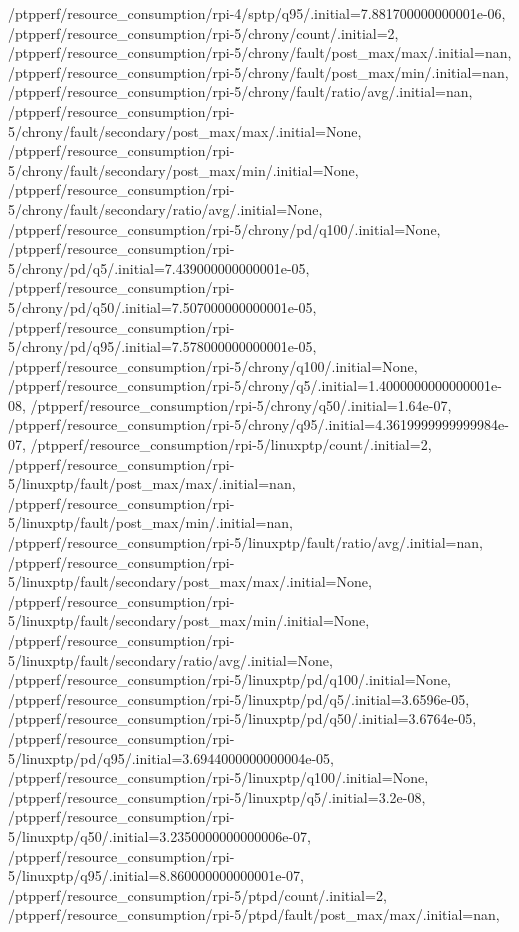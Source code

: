 {    /ptpperf/resource_consumption/rpi-4/sptp/q95/.initial=7.881700000000001e-06,
    /ptpperf/resource_consumption/rpi-5/chrony/count/.initial=2,
    /ptpperf/resource_consumption/rpi-5/chrony/fault/post_max/max/.initial=nan,
    /ptpperf/resource_consumption/rpi-5/chrony/fault/post_max/min/.initial=nan,
    /ptpperf/resource_consumption/rpi-5/chrony/fault/ratio/avg/.initial=nan,
    /ptpperf/resource_consumption/rpi-5/chrony/fault/secondary/post_max/max/.initial=None,
    /ptpperf/resource_consumption/rpi-5/chrony/fault/secondary/post_max/min/.initial=None,
    /ptpperf/resource_consumption/rpi-5/chrony/fault/secondary/ratio/avg/.initial=None,
    /ptpperf/resource_consumption/rpi-5/chrony/pd/q100/.initial=None,
    /ptpperf/resource_consumption/rpi-5/chrony/pd/q5/.initial=7.439000000000001e-05,
    /ptpperf/resource_consumption/rpi-5/chrony/pd/q50/.initial=7.507000000000001e-05,
    /ptpperf/resource_consumption/rpi-5/chrony/pd/q95/.initial=7.578000000000001e-05,
    /ptpperf/resource_consumption/rpi-5/chrony/q100/.initial=None,
    /ptpperf/resource_consumption/rpi-5/chrony/q5/.initial=1.4000000000000001e-08,
    /ptpperf/resource_consumption/rpi-5/chrony/q50/.initial=1.64e-07,
    /ptpperf/resource_consumption/rpi-5/chrony/q95/.initial=4.3619999999999984e-07,
    /ptpperf/resource_consumption/rpi-5/linuxptp/count/.initial=2,
    /ptpperf/resource_consumption/rpi-5/linuxptp/fault/post_max/max/.initial=nan,
    /ptpperf/resource_consumption/rpi-5/linuxptp/fault/post_max/min/.initial=nan,
    /ptpperf/resource_consumption/rpi-5/linuxptp/fault/ratio/avg/.initial=nan,
    /ptpperf/resource_consumption/rpi-5/linuxptp/fault/secondary/post_max/max/.initial=None,
    /ptpperf/resource_consumption/rpi-5/linuxptp/fault/secondary/post_max/min/.initial=None,
    /ptpperf/resource_consumption/rpi-5/linuxptp/fault/secondary/ratio/avg/.initial=None,
    /ptpperf/resource_consumption/rpi-5/linuxptp/pd/q100/.initial=None,
    /ptpperf/resource_consumption/rpi-5/linuxptp/pd/q5/.initial=3.6596e-05,
    /ptpperf/resource_consumption/rpi-5/linuxptp/pd/q50/.initial=3.6764e-05,
    /ptpperf/resource_consumption/rpi-5/linuxptp/pd/q95/.initial=3.6944000000000004e-05,
    /ptpperf/resource_consumption/rpi-5/linuxptp/q100/.initial=None,
    /ptpperf/resource_consumption/rpi-5/linuxptp/q5/.initial=3.2e-08,
    /ptpperf/resource_consumption/rpi-5/linuxptp/q50/.initial=3.2350000000000006e-07,
    /ptpperf/resource_consumption/rpi-5/linuxptp/q95/.initial=8.860000000000001e-07,
    /ptpperf/resource_consumption/rpi-5/ptpd/count/.initial=2,
    /ptpperf/resource_consumption/rpi-5/ptpd/fault/post_max/max/.initial=nan,
}
